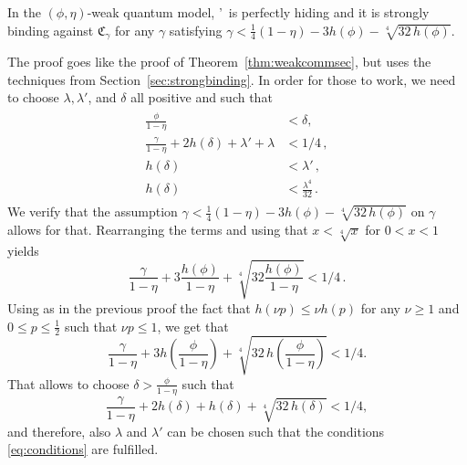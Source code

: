 \begin{theorem}\label{thm:weakcommsecstrong}
  In the $(\phi,\eta)$-weak quantum model, \comm'\ is perfectly hiding
  and it is strongly binding against $\mathfrak{C}_{\gamma}$ for any $\gamma$
  satisfying $\gamma < \frac{1}{4}(1-\eta) - 3 h(\phi) - \sqrt[4]{32
  \, h(\phi)}$.
\end{theorem}
\begin{sketch}
  The proof goes like the proof of Theorem~\ref{thm:weakcommsec}, but
  uses the techniques from Section~\ref{sec:strongbinding}. In order
  for those to work, we need to choose $\lambda, \lambda'$,
  and $\delta$ all positive and such that
\begin{align} \label{eq:conditions} \begin{split}
\frac{\phi}{1 - \eta} &< \delta,  \\
\frac{\gamma}{1 - \eta} + 2 h(\delta) + \lambda' + \lambda &< 1/4 \,
, \\
h(\delta) &< \lambda' \, , \\
h(\delta) &< \frac{\lambda^4}{32} \, .
\end{split} \end{align}
We verify that the assumption $\gamma < \frac{1}{4}(1-\eta) - 3 h(\phi) - \sqrt[4]{32
  \, h(\phi)}$ on $\gamma$ allows for that. Rearranging
the terms and using that $x < \sqrt[4]{x}$ for $0<x<1$ yields
\[
 \frac{\gamma}{1 - \eta} + 3 \frac{h(\phi)}{1 - \eta} +
 \sqrt[4]{32\frac{h(\phi)}{1- \eta}} < 1/4 \, .
\]
Using as in the previous proof the fact that $h(\nu p) \leq \nu h(p)$ for any
$\nu \geq 1$ and $0 \leq p \leq \frac12$ such that $\nu p \leq 1$, we
get that
\[
 \frac{\gamma}{1 - \eta} + 3 h\left(\frac{\phi}{1-\eta}\right) +
 \sqrt[4]{32 \, h\left(\frac{\phi}{1-\eta}\right)} < 1/4.
\]
That allows to choose $\delta > \frac{\phi}{1-\eta}$ such that
\[
 \frac{\gamma}{1 - \eta} + 2 h(\delta) +  h(\delta) + 
 \sqrt[4]{32 \, h(\delta)} < 1/4,
\]
and therefore, also $\lambda$ and $\lambda'$ can be chosen such that
the conditions \eqref{eq:conditions} are fulfilled.
\end{sketch}



